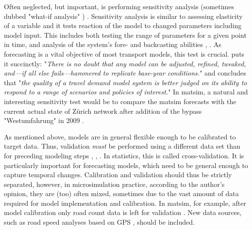 Often neglected, but important, is performing sensitivity analysis (sometimes dubbed "what-if analysis" \citep[][p.155]{Kleijnen_EJOR_1995}) \citep[][]{KurthEtAl_TRBTDF_2006, CambridgeSystematics_manual_2008, CFD_TRB_2007}. Sensitivity analysis is similar to assessing elasticity of a variable \citep[][p.3f]{WegmannEverett_TechRep_CTRUT_2008} and it tests reaction of the model to changed parameters including model input. This includes both testing the range of parameters for a given point in time, and analysis of the system's fore- and backcasting abilities \citep[e.g.,][p.56]{CFD_TRB_2007}, \citep[][]{CambridgeSystematics_manual_2008}. As forecasting is a vital objective of most transport models, this test is crucial. \citet[][p.158]{PendyalaBhat_TRBTDF_2006} puts it succinctly: "\emph{There is no doubt that any model can be adjusted, refined, tweaked, and---if all else fails---hammered to replicate base-year conditions.}" and concludes that "\emph{the quality of a travel demand model system is better judged on its ability to respond to a range of scenarios and policies of interest.}" In \gls{matsim}, a natural and interesting sensitivity test would be to compare the \gls{matsim} forecasts with the current actual state of Zürich network after addition of the bypass "Westumfahrung" in 2009 \citep[][]{BalmerEtAl_ResRep_bdktzrh_2009, Westumfahrung_Webpage_2008}.

As mentioned above, models are in general flexible enough to be calibrated to target data. Thus, validation \emph{must} be performed using a different data set than for preceding modeling steps \citep[][p.1]{CambridgeSystematics_manual_2008}, \citep[][p.56]{CFD_TRB_2007}, \citep[][p.18]{OrtuzarWillumsen_2001}. In statistics, this is called cross-validation. It is particularly important for forecasting models, which need to be general enough to capture temporal changes. Calibration and validation should thus be strictly separated, however, in microsimulation practice, according to the author's opinion, they are (too) often mixed, sometimes due to the vast amount of data required for model implementation and calibration. In \gls{matsim}, for example, after model calibration only road count data is left for validation \citep[][]{HorniEtAl_STRC_2009}. New data sources, such as road speed analyses based on GPS \citep[][]{HackneyEtAl_JGS_2007}, should be included.

